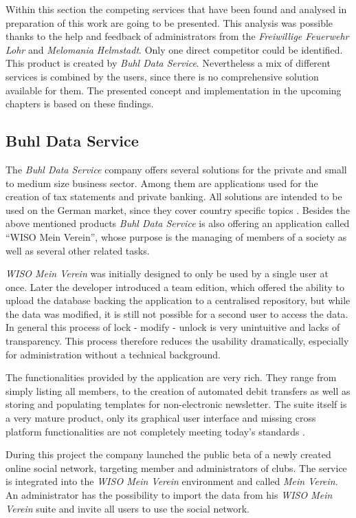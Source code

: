 Within this section the competing services that have been found and analysed in preparation of this work are going to be presented. This analysis was possible thanks to the help and feedback of administrators from the \emph{Freiwillige Feuerwehr Lohr} and \emph{Melomania Helmstadt}. Only one direct competitor could be identified. This product is created by \emph{Buhl Data Service}. Nevertheless a mix of different services is combined by the users, since there is no comprehensive solution available for them. The presented concept and implementation in the upcoming chapters is based on these findings.

\subsection{Buhl Data Service}

The \emph{Buhl Data Service} company offers several solutions for the private and small to medium size business sector. Among them are applications used for the creation of tax statements and private banking. All solutions are intended to be used on the German market, since they cover country specific topics \cite{Buhl:2015aa}. Besides the above mentioned products \emph{Buhl Data Service} is also offering an application called \enquote{WISO Mein Verein}, whose purpose is the managing of members of a society as well as several other related tasks.

\emph{WISO Mein Verein} was initially designed to only be used by a single user at once. Later the developer introduced a team edition, which offered the ability to upload the database backing the application to a centralised repository, but while the data was modified, it is still not possible for a second user to access the data. In general this process of lock - modify - unlock is very unintuitive and lacks of transparency. This process therefore reduces the usability dramatically, especially for administration without a technical background.

The functionalities provided by the application are very rich. They range from simply listing all members, to the creation of automated debit transfers as well as storing and populating templates for non-electronic newsletter. The suite itself is a very mature product, only its graphical user interface and missing cross platform functionalities are not completely meeting today's standards \cite{Buhl:2015ab}. 

During this project the company launched the public beta of a newly created online social network, targeting member and administrators of clubs. The service is integrated into the \emph{WISO Mein Verein} environment and called \emph{Mein Verein}. An administrator has the possibility to import the data from his \emph{WISO Mein Verein} suite and invite all users to use the social network. 

